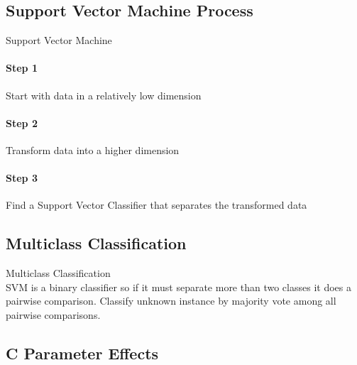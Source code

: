 \subsection{Support Vector Machine Process}

\begin{KR}{Support Vector Machine}\\
\paragraph{Step 1}
Start with data in a relatively low dimension

\paragraph{Step 2}
Transform data into a higher dimension

\paragraph{Step 3}
Find a Support Vector Classifier that separates the transformed data
\end{KR}


\subsection{Multiclass Classification}

\begin{concept}{Multiclass Classification}\\
SVM is a binary classifier so if it must separate more than two classes it does a pairwise comparison. Classify unknown instance by majority vote among all pairwise comparisons.
\end{concept}


\subsection{C Parameter Effects}


